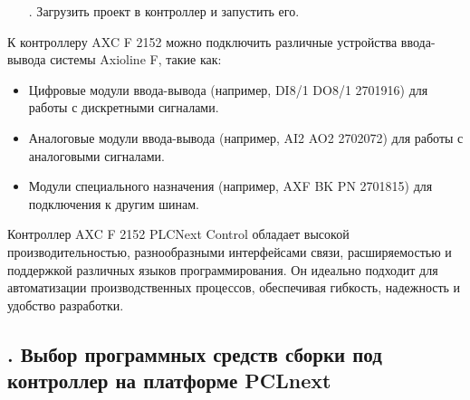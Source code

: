 {\begin{itemize}[leftmargin=2.15cm, labelwidth=0.65cm, labelsep=0.0cm]
		\addtocounter{itemcntr}{1}
		
		\item[\theitemcntr. ] Загрузить проект в контроллер и запустить его.
		
		\addtocounter{itemcntr}{1}
		
		\setcounter{itemcntr}{1}
	\end{itemize}
	
	\par \redline К контроллеру AXC F 2152 можно подключить различные устройства ввода-вывода системы Axioline F, такие как:
	
		\begin{itemize}[leftmargin=2.15cm, labelwidth=0.65cm, labelsep=0.0cm] 
		
		\item	Цифровые модули ввода-вывода (например, DI8/1 DO8/1 2701916) для работы с дискретными сигналами. 
		
		\addtocounter{itemcntr}{1}
		
		\item	Аналоговые модули ввода-вывода (например, AI2 AO2 2702072) для работы с аналоговыми сигналами. 
		
		\addtocounter{itemcntr}{1}
		
		\item	Модули специального назначения (например, AXF BK PN 2701815) для подключения к другим шинам.
		
		\addtocounter{itemcntr}{1}
		
		\setcounter{itemcntr}{1}
	\end{itemize}
	
	\par \redline Контроллер AXC F 2152 PLCNext Control обладает высокой производительностью, разнообразными интерфейсами связи, расширяемостью и поддержкой различных языков программирования. Он идеально подходит для автоматизации производственных процессов, обеспечивая гибкость, надежность и удобство разработки.

	
	\par
}


\subtitlespace

\subsection*{ 
	\gostTitleFont
	\redline
	\thechaptercntr .\thesubchaptercntr \spc
	Выбор программных средств сборки под контроллер на платформе PCLnext
} \addtocounter{subchaptercntr}{1}

